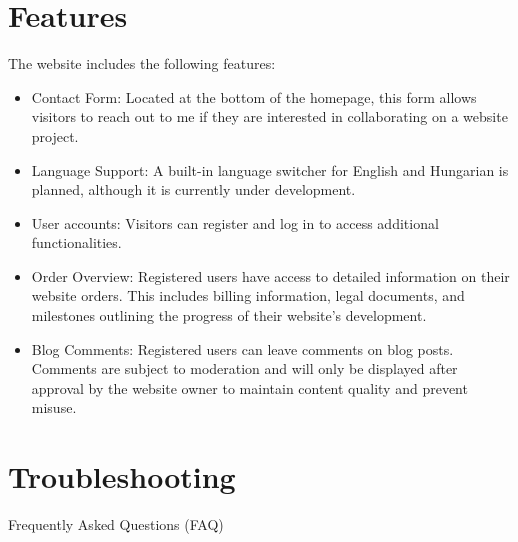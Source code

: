 \documentclass[12pt,a4paper]{report}
\begin{document}
\section{Features}
The website includes the following features:

\begin{itemize}
    \item Contact Form: Located at the bottom of the homepage, this form allows visitors to reach out to me if they are interested in collaborating on a website project.

    \item Language Support: A built-in language switcher for English and Hungarian is planned, although it is currently under development.

    \item User accounts: Visitors can register and log in to access additional functionalities.

    \item Order Overview: Registered users have access to detailed information on their website orders. This includes billing information, legal documents, and milestones outlining the progress of their website's development.

    \item Blog Comments: Registered users can leave comments on blog posts. Comments are subject to moderation and will only be displayed after approval by the website owner to maintain content quality and prevent misuse.

\end{itemize}


\section{Troubleshooting}
Frequently Asked Questions (FAQ)
\end{document}
